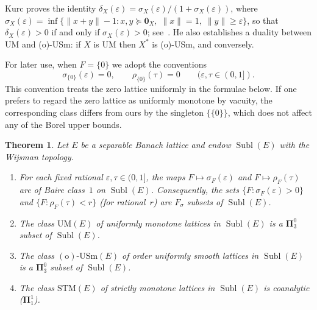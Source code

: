 \documentclass[12pt]{amsart}
\renewcommand{\ge}{\geqslant}
\theoremstyle{plain}
\newtheorem{theorem}{Theorem}[section]
\theoremstyle{definition}
\theoremstyle{remark}
\DeclareMathOperator{\Subl}{Subl}
\begin{document}
Kurc proves the identity
$\delta_X(\varepsilon) = \sigma_X(\varepsilon) / (1 + \sigma_X(\varepsilon))$,
where
$\sigma_X(\varepsilon)
= \inf\{\lVert x + y \rVert - 1 \colon
  x, y \succeq \mathbf{0}_X,\;
  \lVert x \rVert = 1,\;
  \lVert y \rVert \ge \varepsilon\}$,
so that $\delta_X(\varepsilon) > 0$ if and only if
$\sigma_X(\varepsilon) > 0$; see~\cite{Kurc1993Dual}.  He also establishes a
duality between UM and (o)-USm: if $X$ is UM then $X^*$ is (o)-USm, and
conversely.

For later use, when $F = \{0\}$ we adopt the conventions
\[
    \sigma_{\{0\}}(\varepsilon) = 0,
    \qquad
    \rho_{\{0\}}(\tau) = 0
    \qquad (\varepsilon,\tau \in (0,1]).
\]
This convention treats the zero lattice uniformly in the formulae below.  If one
prefers to regard the zero lattice as uniformly monotone by vacuity, the
corresponding class differs from ours by the singleton $\{\{0\}\}$, which does
not affect any of the Borel upper bounds.

\begin{theorem}\label{thm:kurc-borel}
Let $E$ be a separable Banach lattice and endow $\Subl(E)$ with the Wijsman
topology.
\begin{enumerate}[label=\textup{(\alph*)}]
    \item\label{kurc:baire1}
      For each fixed rational $\varepsilon, \tau \in (0, 1]$, the maps
      $F \mapsto \sigma_F(\varepsilon)$ and $F \mapsto \rho_F(\tau)$ are of
      Baire class~$1$ on $\Subl(E)$.  Consequently, the sets
      $\{F \colon \sigma_F(\varepsilon) > 0\}$ and
      $\{F \colon \rho_F(\tau) < r\}$ (for rational~$r$) are $F_\sigma$ subsets
      of $\Subl(E)$.
    \item\label{kurc:UM}
      The class $\mathrm{UM}(E)$ of uniformly monotone lattices in $\Subl(E)$
      is a $\boldsymbol{\Pi}^0_3$ subset of $\Subl(E)$.
    \item\label{kurc:oUSm}
      The class $\mathrm{(o)\text{-}USm}(E)$ of order uniformly smooth lattices
      in $\Subl(E)$ is a $\boldsymbol{\Pi}^0_3$ subset of $\Subl(E)$.
    \item\label{kurc:STM}
      The class $\mathrm{STM}(E)$ of strictly monotone lattices in $\Subl(E)$
      is coanalytic ($\boldsymbol{\Pi}^1_1$).
\end{enumerate}
\end{theorem}
\end{document}
